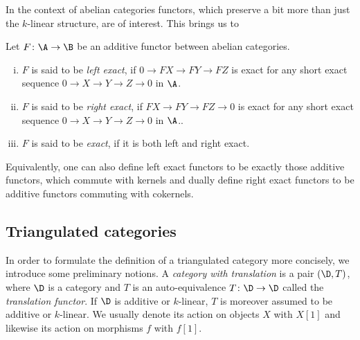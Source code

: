 In the context of abelian categories functors, which preserve a bit more than just the $k$-linear structure, are of interest. This brings us to

\begin{definition}
    Let $F \colon \A \to \B$ be an additive functor between abelian categories. 
    \begin{enumerate}[(i)]
        \item $F$ is said to be \emph{left exact}, if $0 \to FX \to FY \to FZ$ is exact for any short exact sequence $0 \to X \to Y \to Z \to 0$ in $\A$.
        \item $F$ is said to be \emph{right exact}, if $FX \to FY \to FZ \to 0$ is exact for any short exact sequence $0 \to X \to Y \to Z \to 0$ in $\A$..
        \item $F$ is said to be \emph{exact}, if it is both left and right exact. 
    \end{enumerate}
\end{definition}

\begin{remark}
    Equivalently, one can also define left exact functors to be exactly those additive functors, which commute with kernels and dually define right exact functors to be additive functors commuting with cokernels.  
\end{remark}

\subsection{Triangulated categories}

In order to formulate the definition of a triangulated category more concisely, we introduce some preliminary notions. A \emph{category with translation} is a pair $(\D, T)$, where $\D$ is a category and $T$ is an auto-equivalence $T\colon \D \to \D$ called the \emph{translation functor}. If $\D$ is additive or $k$-linear, $T$ is moreover assumed to be additive or $k$-linear. We usually denote its action on objects $X$ with $X[1]$ and likewise its action on morphisms $f$ with $f[1]$.

